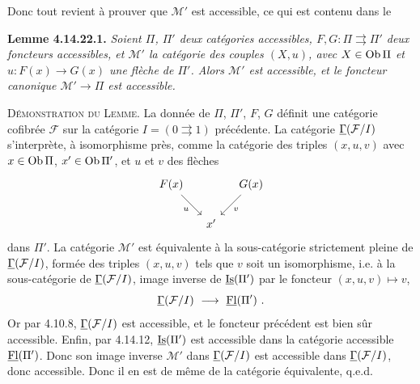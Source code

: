 Donc tout revient à prouver que $\mathcal{M}'$ est accessible, ce qui est contenu dans le

\textbf{Lemme 4.14.22.1.} \textit{Soient $\Pi$, $\Pi'$ deux catégories accessibles, $F,G:\Pi\rightrightarrows\Pi'$ deux foncteurs accessibles, et $\mathcal{M}'$ la catégorie des couples $(X,u)$, avec $X\in\operatorname{Ob}\Pi$ et $u:F(x)\longrightarrow G(x)$ une flèche de $\Pi'$. Alors $\mathcal{M}'$ est accessible, et le foncteur canonique $\mathcal{M}'\longrightarrow\Pi$ est accessible.} %

\textsc{Démonstration du Lemme.} La donnée de $\Pi$, $\Pi'$, $F$, $G$ définit une catégorie cofibrée $\mathcal{F}$ sur la catégorie $I=(0\rightrightarrows 1)$
précédente. La catégorie $\underline{\Gamma}(\mathcal{F}/I)$ s'interprète, à isomorphisme près, comme la catégorie des triples $(x,u,v)$ avec $x\in\operatorname{Ob}\Pi$, $x'\in\operatorname{Ob}\Pi'$, et $u$ et $v$ des flèches
\[
\begin{tikzcd}[column sep=small]
F(x) \arrow[dr, "u"'] & & G(x) \arrow[dl, "v"] \\
& x' &
\end{tikzcd}
\]
dans $\Pi'$. La catégorie $\mathcal{M}'$ est équivalente à la sous-catégorie strictement pleine de $\underline{\Gamma}(\mathcal{F}/I)$, formée des triples $(x,u,v)$ tels que $v$ soit un isomorphisme, i.e. à la sous-catégorie de $\underline{\Gamma}(\mathcal{F}/I)$, image inverse de $\underline{\mathrm{Is}}(\Pi')$ par le foncteur $(x,u,v)\longmapsto v$,
\[
\uGamma(\mathcal{F}/I)\ \longrightarrow\ \uFl(\Pi')\ .
\]
Or par 4.10.8, $\underline{\Gamma}(\mathcal{F}/I)$ est accessible, et le foncteur précédent est bien sûr accessible. Enfin, par 4.14.12,
$\underline{\mathrm{Is}}(\Pi')$ est accessible dans la catégorie accessible $\underline{\mathrm{Fl}}(\Pi')$. Donc son image inverse $\mathcal{M}'$ dans $\underline{\Gamma}(\mathcal{F}/I)$ est accessible dans $\underline{\Gamma}(\mathcal{F}/I)$, donc accessible. Donc il en est de même de la catégorie équivalente, q.e.d.

